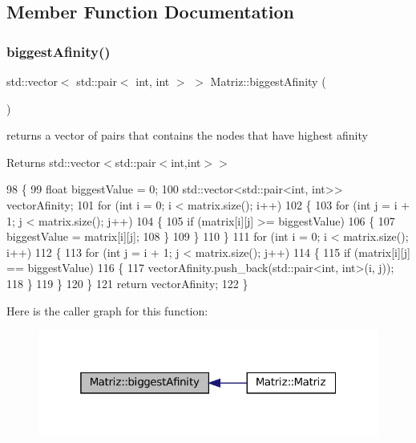 \subsection{Member Function Documentation}
\mbox{\label{classMatriz_a2867d653d30b7fd8ca13e683bd7b8de6}} 
\subsubsection{\texorpdfstring{biggest\+Afinity()}{biggestAfinity()}}
{\footnotesize\ttfamily std\+::vector$<$ std\+::pair$<$ int, int $>$ $>$ Matriz\+::biggest\+Afinity (\begin{DoxyParamCaption}{ }\end{DoxyParamCaption})}



returns a vector of pairs that contains the nodes that have highest afinity 

\begin{DoxyReturn}{Returns}
std\+::vector$<$std\+::pair$<$int,int$>$$>$ 
\end{DoxyReturn}

\begin{DoxyCode}
98 \{
99   \textcolor{keywordtype}{float} biggestValue = 0;
100   std::vector<std::pair<int, int>> vectorAfinity;
101   \textcolor{keywordflow}{for} (\textcolor{keywordtype}{int} i = 0; i < matrix.size(); i++)
102   \{
103     \textcolor{keywordflow}{for} (\textcolor{keywordtype}{int} j = i + 1; j < matrix.size(); j++)
104     \{
105       \textcolor{keywordflow}{if} (matrix[i][j] >= biggestValue)
106       \{
107         biggestValue = matrix[i][j];
108       \}
109     \}
110   \}
111   \textcolor{keywordflow}{for} (\textcolor{keywordtype}{int} i = 0; i < matrix.size(); i++)
112   \{
113     \textcolor{keywordflow}{for} (\textcolor{keywordtype}{int} j = i + 1; j < matrix.size(); j++)
114     \{
115       \textcolor{keywordflow}{if} (matrix[i][j] == biggestValue)
116       \{
117         vectorAfinity.push\_back(std::pair<int, int>(i, j));
118       \}
119     \}
120   \}
121   \textcolor{keywordflow}{return} vectorAfinity;
122 \}
\end{DoxyCode}
Here is the caller graph for this function\+:\nopagebreak
\begin{figure}[H]
\begin{center}
\leavevmode
\includegraphics[width=319pt]{classMatriz_a2867d653d30b7fd8ca13e683bd7b8de6_icgraph}
\end{center}
\end{figure}
\mbox{\label{classMatriz_a30e8aba7a2868aaa98f11d3037ff8319}} 
